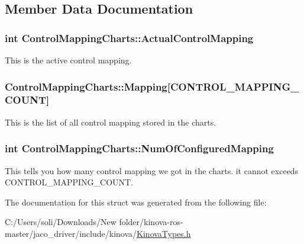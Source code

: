 \subsection{Member Data Documentation}
\subsubsection[{\texorpdfstring{Actual\+Control\+Mapping}{ActualControlMapping}}]{\setlength{\rightskip}{0pt plus 5cm}int Control\+Mapping\+Charts\+::\+Actual\+Control\+Mapping}\hypertarget{struct_control_mapping_charts_a72cbb9155615519fd17ea5228fd19f8f}{}\label{struct_control_mapping_charts_a72cbb9155615519fd17ea5228fd19f8f}


This is the active control mapping. 

\subsubsection[{\texorpdfstring{Mapping}{Mapping}}]{ Control\+Mapping\+Charts\+::\+Mapping\mbox{[}{\bf C\+O\+N\+T\+R\+O\+L\+\_\+\+M\+A\+P\+P\+I\+N\+G\+\_\+\+C\+O\+U\+NT}\mbox{]}}\hypertarget{struct_control_mapping_charts_a1b72a247e0b46f49b30221f2b4f7497e}{}\label{struct_control_mapping_charts_a1b72a247e0b46f49b30221f2b4f7497e}


This is the list of all control mapping stored in the charts. 

\subsubsection[{\texorpdfstring{Num\+Of\+Configured\+Mapping}{NumOfConfiguredMapping}}]{\setlength{\rightskip}{0pt plus 5cm}int Control\+Mapping\+Charts\+::\+Num\+Of\+Configured\+Mapping}\hypertarget{struct_control_mapping_charts_a302a3bc9e63b9e737ca9c99bb251e4d7}{}\label{struct_control_mapping_charts_a302a3bc9e63b9e737ca9c99bb251e4d7}


This tells you how many control mapping we got in the charts. it cannot exceeds C\+O\+N\+T\+R\+O\+L\+\_\+\+M\+A\+P\+P\+I\+N\+G\+\_\+\+C\+O\+U\+NT. 



The documentation for this struct was generated from the following file\+:\begin{DoxyCompactItemize}
\item 
C\+:/\+Users/soli/\+Downloads/\+New folder/kinova-\/ros-\/master/jaco\+\_\+driver/include/kinova/\hyperlink{_kinova_types_8h}{Kinova\+Types.\+h}\end{DoxyCompactItemize}
